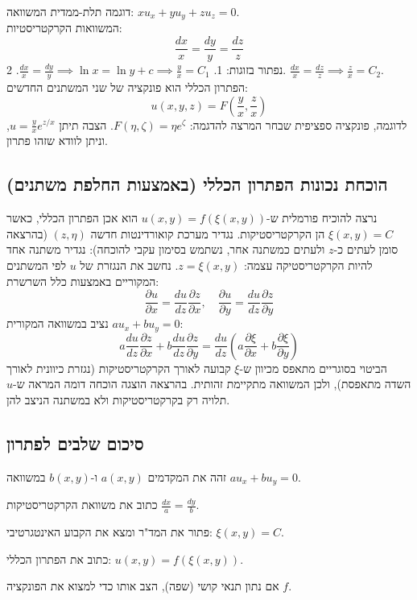 \begin{examplebox}{דוגמה תלת-ממדית}
המשוואה: $x u_x + y u_y + z u_z = 0$.
\\
המשוואות הקרקטריסטיות:
\[ \frac{dx}{x} = \frac{dy}{y} = \frac{dz}{z} \]
נפתור בזוגות:
1. $\frac{dx}{x} = \frac{dy}{y} \implies \ln x = \ln y + c \implies \frac{y}{x} = C_1$.
2. $\frac{dx}{x} = \frac{dz}{z} \implies \frac{z}{x} = C_2$.
\\
הפתרון הכללי הוא פונקציה של שני המשתנים החדשים:
\[ u(x,y,z) = F\left(\frac{y}{x}, \frac{z}{x}\right) \]
לדוגמה, פונקציה ספציפית שבחר המרצה להדגמה: $F(\eta, \zeta) = \eta e^{\zeta}$. הצבה תיתן $u = \frac{y}{x}e^{z/x}$, וניתן לוודא שזהו פתרון.
\end{examplebox}

\subsection{הוכחת נכונות הפתרון הכללי (באמצעות החלפת משתנים)}

נרצה להוכיח פורמלית ש-$u(x,y) = f(\xi(x,y))$ הוא אכן הפתרון הכללי, כאשר $\xi(x,y)=C$ הן הקרקטריסטיקות.
נגדיר מערכת קואורדינטות חדשה $(z, \eta)$ (בהרצאה סומן לעתים כ-$z$ ולעתים כמשתנה אחר, נשתמש בסימון עקבי להוכחה):
נגדיר משתנה אחד להיות הקרקטריסטיקה עצמה: $z = \xi(x,y)$.
נחשב את הנגזרת של $u$ לפי המשתנים המקוריים באמצעות כלל השרשרת:
\[ \frac{\partial u}{\partial x} = \frac{du}{dz}\frac{\partial z}{\partial x}, \quad \frac{\partial u}{\partial y} = \frac{du}{dz}\frac{\partial z}{\partial y} \]
נציב במשוואה המקורית $a u_x + b u_y = 0$:
\[ a \frac{du}{dz}\frac{\partial z}{\partial x} + b \frac{du}{dz}\frac{\partial z}{\partial y} = \frac{du}{dz} \left( a \frac{\partial \xi}{\partial x} + b \frac{\partial \xi}{\partial y} \right) \]
הביטוי בסוגריים מתאפס מכיוון ש-$\xi$ קבועה לאורך הקרקטריסטיקות (נגזרת כיוונית לאורך השדה מתאפסת), ולכן המשוואה מתקיימת זהותית. בהרצאה הוצגה הוכחה דומה המראה ש-$u$ תלויה רק בקרקטריסטיקות ולא במשתנה הניצב להן.

\subsection{סיכום שלבים לפתרון}
\begin{steps}
    \item זהה את המקדמים $a(x,y)$ ו-$b(x,y)$ במשוואה $au_x + bu_y = 0$.
    \item כתוב את משוואת הקרקטריסטיקות $\frac{dx}{a} = \frac{dy}{b}$.
    \item פתור את המד"ר ומצא את הקבוע האינטגרטיבי: $\xi(x,y) = C$.
    \item כתוב את הפתרון הכללי: $u(x,y) = f(\xi(x,y))$.
    \item אם נתון תנאי קושי (שפה), הצב אותו כדי למצוא את הפונקציה $f$.
\end{steps}